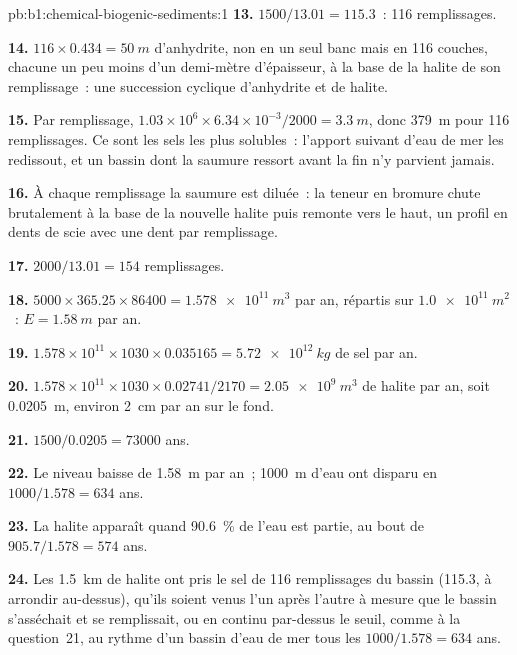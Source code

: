 \begin{solution}{pb:b1:chemical-biogenic-sediments:1}
\textbf{13.} $1500/13.01 = 115.3$~: 116 remplissages.

\textbf{14.} $116\times0.434 = \qty{50}{m}$ d'anhydrite, non en un seul banc mais en
116 couches, chacune un peu moins d'un demi-mètre d'épaisseur, à la base de la halite de
son remplissage~: une succession cyclique d'anhydrite et de halite.

\textbf{15.} Par remplissage, $1.03\times10^6\times6.34\times10^{-3}/2000 =
\qty{3.3}{m}$, donc \qty{379}{m} pour 116 remplissages. Ce sont les sels les plus
solubles~: l'apport suivant d'eau de mer les redissout, et un bassin dont la saumure
ressort avant la fin n'y parvient jamais.

\textbf{16.} À chaque remplissage la saumure est diluée~: la teneur en bromure chute
brutalement à la base de la nouvelle halite puis remonte vers le haut, un profil en dents de
scie avec une dent par remplissage.

\textbf{17.} $2000/13.01 = 154$ remplissages.

\textbf{18.} $5000\times365.25\times86400 = \qty{1.578e11}{m^3}$ par an, répartis
sur $\qty{1.0e11}{m^2}$~: $E = \qty{1.58}{m}$ par an.

\textbf{19.} $1.578\times10^{11}\times1030\times0.035165 = \qty{5.72e12}{kg}$ de
sel par an.

\textbf{20.} $1.578\times10^{11}\times1030\times0.02741/2170 =
\qty{2.05e9}{m^3}$ de halite par an, soit \qty{0.0205}{m}, environ \qty{2}{cm}
par an sur le fond.

\textbf{21.} $1500/0.0205 = \num{73000}$ ans.

\textbf{22.} Le niveau baisse de \qty{1.58}{m} par an~; \qty{1000}{m} d'eau ont
disparu en $1000/1.578 = 634$ ans.

\textbf{23.} La halite apparaît quand \qty{90.6}{\%} de l'eau est partie, au bout de
$905.7/1.578 = 574$ ans.

\textbf{24.} Les \qty{1.5}{km} de halite ont pris le sel de 116 remplissages du
bassin (115.3, à arrondir au-dessus), qu'ils soient venus l'un après l'autre à mesure que le
bassin s'asséchait et se remplissait, ou en continu par-dessus le seuil, comme à la
question~21, au rythme d'un bassin d'eau de mer tous les
$1000/1.578 = 634$ ans.
\end{solution}
